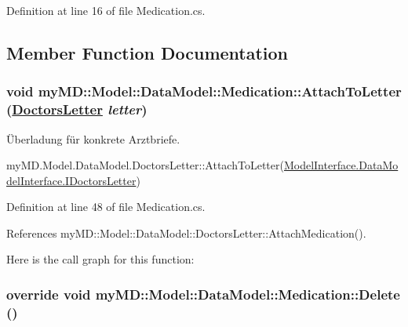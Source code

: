 Definition at line 16 of file Medication.cs.

\subsection{Member Function Documentation}
\hypertarget{classmy_m_d_1_1_model_1_1_data_model_1_1_medication_f33d09abc414149017c4c8029c0d2d3a}{
\subsubsection[AttachToLetter]{\setlength{\rightskip}{0pt plus 5cm}void my\-MD::Model::Data\-Model::Medication::Attach\-To\-Letter (\hyperlink{classmy_m_d_1_1_model_1_1_data_model_1_1_doctors_letter}{Doctors\-Letter} {\em letter})}}
\label{d0/daf/classmy_m_d_1_1_model_1_1_data_model_1_1_medication_f33d09abc414149017c4c8029c0d2d3a}


\"{U}berladung f\"{u}r konkrete Arztbriefe. 

my\-MD.Model.Data\-Model.Doctors\-Letter::Attach\-To\-Letter(\hyperlink{interfacemy_m_d_1_1_model_interface_1_1_data_model_interface_1_1_i_doctors_letter}{Model\-Interface.Data\-Model\-Interface.IDoctors\-Letter}) 

Definition at line 48 of file Medication.cs.

References my\-MD::Model::Data\-Model::Doctors\-Letter::Attach\-Medication().

Here is the call graph for this function:\hypertarget{classmy_m_d_1_1_model_1_1_data_model_1_1_medication_51a833214dab53bfafb630573fc0fe77}{
\subsubsection[Delete]{\setlength{\rightskip}{0pt plus 5cm}override void my\-MD::Model::Data\-Model::Medication::Delete ()}}
\label{d0/daf/classmy_m_d_1_1_model_1_1_data_model_1_1_medication_51a833214dab53bfafb630573fc0fe77}


